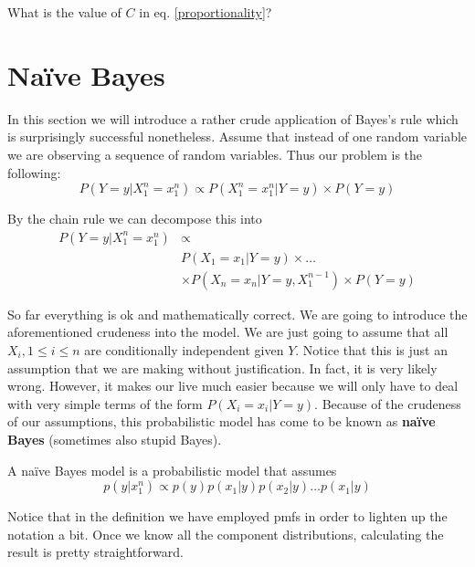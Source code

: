 \begin{Exercise}
What is the value of $ C $ in eq. \ref{proportionality}?
\end{Exercise}



\section{Na\"ive Bayes}
In this section we will introduce a rather crude application of Bayes's rule which is surprisingly successful nonetheless.
Assume that instead of one random variable we are observing a sequence of random variables. Thus our problem is the following:
\begin{equation}
P(Y=y|X_{1}^{n}=x_{1}^{n}) \propto P(X_{1}^{n}=x_{1}^{n}|Y=y) \times P(Y=y) 
\end{equation}

By the chain rule we can decompose this into
\begin{align}
P(Y=y|X_{1}^{n}=x_{1}^{n}) &\propto \\
&P(X_{1}=x_{1}|Y=y) \times \ldots \nonumber \\
&\times P(X_{n}=x_{n}|Y=y,X_{1}^{n-1}) \times P(Y=y) \nonumber
\end{align}

So far everything is ok and mathematically correct. We are going to introduce the aforementioned crudeness into the model.
We are just going to assume that all $ X_{i}, 1 \leq i \leq n  $ are conditionally independent given $ Y $. Notice that
this is just an assumption that we are making without justification. In fact, it is very likely wrong. However, it makes our
live much easier because we will only have to deal with very simple terms of the form $ P(X_{i}=x_{i}|Y=y) $. Because of the
crudeness of our assumptions, this probabilistic model has come to be known as \textbf{na\"ive Bayes} (sometimes also 
stupid Bayes).

\begin{Definition}
A na\"ive Bayes model is a probabilistic model that assumes
$$ p(y|x_{1}^{n}) \propto p(y)p(x_{1}|y)p(x_{2}|y)\ldots p(x_{1}|y) $$
\end{Definition}

Notice that in the definition we have employed pmfs in order to lighten up the notation a bit. Once we know all the component
distributions, calculating the result is pretty straightforward. 

